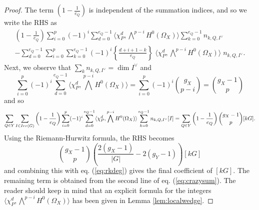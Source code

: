 \documentclass[10pt,a4paper]{amsart}
\begin{document}
\begin{proof}
The term $(1-\frac{1}{e_Q})$ is independent of the summation indices, and so we write the RHS as
\begin{multline}\label{eq:crazysum}
\left(1-\frac{1}{e_Q}\right)
\sum_{i=0}^{p}
(-1)^i
\sum_{d=0}^{e_Q-1}
\langle
\chi_P^{d},
\bigwedge^{p-i}H^0(\Omega_X)
\rangle
\sum_{k=0}^{e_Q-1}
n_{k,Q,I^\vee}
\\
-
\sum_{d=0}^{e_Q-1}\sum_{i=0}^{p}\sum_{k=0}^{e_Q-1}
(-1)^i
\left\{
\frac{d+i+1-k}{e_Q}
\right\}
\;
\langle
\chi_P^{d},
\bigwedge^{p-i}H^0(\Omega_X)
\rangle
\;
n_{k,Q,I^\vee}.
\end{multline}
Next, we observe that $\sum_k n_{k,Q,I^\vee}=\dim I^\vee$ and
\[
\sum_{i=0}^{p}
(-1)^i
\sum_{d=0}^{e_Q-1}
\langle
\chi_P^{d},
\bigwedge^{p-i}H^0(\Omega_X)
\rangle
=
\sum_{i=0}^{p}
(-1)^i \binom{g_X}{p-i}
=
\binom{g_X-1}{p}
\]
and so
\[
\sum_{Q\in Y}\sum_{I\in{\rm Irr}(G)} \left(1-\frac{1}{e_Q}\right)
\sum_{i=0}^{p}
(-1)^i
\sum_{d=0}^{e_Q-1}
\langle
\chi_P^{d},
\bigwedge^{p-i}H^0(\Omega_X)
\rangle
\sum_{k=0}^{e_Q-1}
n_{k,Q,I^\vee}
[I]
=
\sum_{Q\in Y}\left(1-\frac{1}{e_Q}\right)
\binom{g_X-1}{p}
[kG].
\]
Using the Riemann-Hurwitz formula, the RHS becomes
\[
\binom{g_X-1}{p}\left(\frac{2(g_X-1)}{|G|}-2(g_Y-1)\right)[kG]
\]
and combining this with eq. (\ref{eq:rkdeg}) gives the final coefficient of $[kG]$. The remaining term is obtained from the second line of eq. (\ref{eq:crazysum}). The reader should keep in mind that an explicit formula for the integers $\langle
\chi_P^{d},
\bigwedge^{p-i}H^0(\Omega_X)
\rangle$ has been given in Lemma \ref{lem:localwedge}.
\end{proof}
\end{document}
